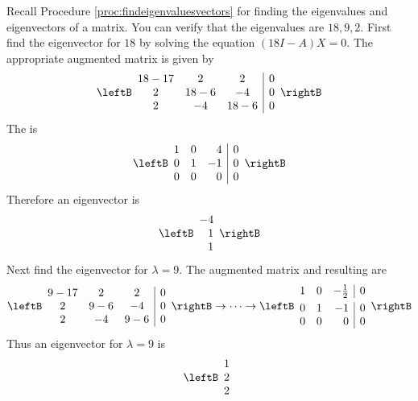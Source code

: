 \begin{solution}
Recall Procedure \ref{proc:findeigenvaluesvectors} for finding the eigenvalues and eigenvectors of a matrix. You can verify that the eigenvalues are $18,9,2.$ First find the eigenvector for $18$ by solving the equation $(18I-A)X = 0$. 
The appropriate augmented matrix is given by  
\begin{equation*}
\leftB
\begin{array}{ccc|c}
18-17 & 2 & 2 & 0 \\ 
2 & 18-6 & -4 & 0 \\ 
2 & -4 & 18-6 & 0
\end{array}
\rightB
\end{equation*}
The \rref \;is 
\begin{equation*}
\leftB
\begin{array}{rrr|r}
1 & 0 & 4 & 0 \\ 
0 & 1 & -1 & 0 \\ 
0 & 0 & 0 & 0
\end{array}
\rightB
\end{equation*}
Therefore an eigenvector is 
\begin{equation*}
\leftB
\begin{array}{r}
-4 \\ 
1 \\ 
1
\end{array}
\rightB
\end{equation*}
Next find the eigenvector for $\lambda =9.$ The augmented matrix and resulting \rref \;are 
\begin{equation*}
\leftB
\begin{array}{ccc|c}
9-17 & 2 & 2 & 0 \\ 
2 & 9-6 & -4 & 0 \\ 
2 & -4 & 9-6 & 0
\end{array}
\rightB
\rightarrow \cdots \rightarrow
\leftB
\begin{array}{rrr|r}
1 & 0 & -\vspace{0.05in}\frac{1}{2} & 0 \\ 
0 & 1 & -1 & 0 \\ 
0 & 0 & 0 & 0
\end{array}
\rightB
\end{equation*}
Thus an eigenvector for $\lambda =9$ is 
\begin{equation*}
\leftB
\begin{array}{r}
1 \\ 
2 \\ 
2
\end{array}

\end{equation*}
\end{solution}

